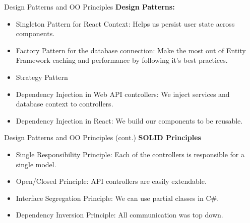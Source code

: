 \documentclass{beamer}
\begin{document}
\begin{frame}{Design Patterns and OO Principles}
    \textbf{Design Patterns:}
    \begin{itemize}
        \item Singleton Pattern for React Context: Helps us persist user state across components.
        \item Factory Pattern for the database connection: Make the most out of Entity Framework caching and 
        performance by following it's best practices. 
        \item Strategy Pattern
        \item Dependency Injection in Web API controllers: We inject services and database context to controllers.
        \item Dependency Injection in React: We build our components to be reusable.
    \end{itemize}
\end{frame}

\begin{frame}{Design Patterns and OO Principles (cont.)}
\textbf{SOLID Principles}
    \begin{itemize}
        \item Single Responsibility Principle: Each of the controllers is responsible for a single model.
        \item Open/Closed Principle: API controllers are easily extendable.
        \item Interface Segregation Principle: We can use partial classes in C\#.
        \item Dependency Inversion Principle: All communication was top down.
    \end{itemize}
\end{frame}
\end{document}
